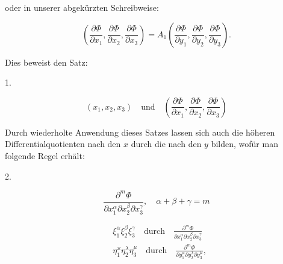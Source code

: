oder in unserer abgekürzten Schreibweise:

\[
\left(\frac{\partial \Phi}{\partial x_1}, \frac{\partial \Phi}{\partial x_2}, \frac{\partial \Phi}{\partial x_3}\right) = A_1 \left(\frac{\partial \Phi}{\partial y_1}, \frac{\partial \Phi}{\partial y_2}, \frac{\partial \Phi}{\partial y_3}\right).
\]

Dies beweist den Satz:

1. 

\[
(x_1, x_2, x_3) \quad \text{und} \quad \left(\frac{\partial \Phi}{\partial x_1}, \frac{\partial \Phi}{\partial x_2}, \frac{\partial \Phi}{\partial x_3}\right)
\]


Durch wiederholte Anwendung dieses Satzes lassen sich auch die höheren Differentialquotienten nach den $x$ durch die nach den $y$ bilden, wofür man folgende Regel erhält:

2. 

\[
\frac{\partial^m \Phi}{\partial x_1^\alpha \partial x_2^\beta \partial x_3^\gamma}, \quad \alpha + \beta + \gamma = m
\]




\[
\begin{aligned}
&\xi_1^\alpha \xi_2^\beta \xi_3^\gamma \quad \text{durch} \quad \frac{\partial^m \Phi}{\partial x_1^\alpha \partial x_2^\beta \partial x_3^\gamma} \\
&\eta_1^\varkappa \eta_2^\lambda \eta_3^\mu \quad \text{durch} \quad \frac{\partial^m \Phi}{\partial y_1^\varkappa \partial y_2^\lambda \partial y_3^\mu},
\end{aligned}
\]




